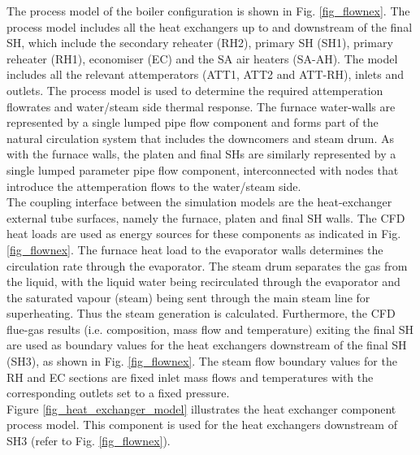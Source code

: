 \documentclass[twocolumn,10pt]{asme2ej}
\begin{document}
The process model of the boiler configuration is shown in Fig. \ref{fig_flownex}. The process model includes all the heat exchangers up to and downstream of the final SH, which include the secondary reheater (RH2), primary SH (SH1), primary reheater (RH1), economiser (EC) and the SA air heaters (SA-AH). The model includes all the relevant attemperators (ATT1, ATT2 and ATT-RH), inlets and outlets. The process model is used to determine the required attemperation flowrates and water/steam side thermal response. The furnace water-walls are represented by a single lumped pipe flow component and forms part of the natural circulation system that includes the downcomers and steam drum. As with the furnace walls, the platen and final SHs are similarly represented by a single lumped parameter pipe flow component, interconnected with nodes that introduce the attemperation flows to the water/steam side.\\ 

The coupling interface between the simulation models are the heat-exchanger external tube surfaces, namely the furnace, platen and final SH walls. The CFD heat loads are used as energy sources for these components as indicated in Fig. \ref{fig_flownex}. The furnace heat load to the evaporator walls determines the circulation rate through the evaporator. The steam drum separates the gas from the liquid, with the liquid water being recirculated through the evaporator and the saturated vapour (steam) being sent through the main steam line for superheating. Thus the steam generation is calculated. Furthermore, the CFD flue-gas results (i.e. composition, mass flow and temperature) exiting the final SH are used as boundary values for the heat exchangers downstream of the final SH (SH3), as shown in Fig. \ref{fig_flownex}. The steam flow boundary values for the RH and EC sections are fixed inlet mass flows and temperatures with the corresponding outlets set to a fixed pressure.\\

Figure \ref{fig_heat_exchanger_model} illustrates the heat exchanger component process model. This component is used for the heat exchangers downstream of SH3 (refer to Fig. \ref{fig_flownex}).\\
\end{document}
